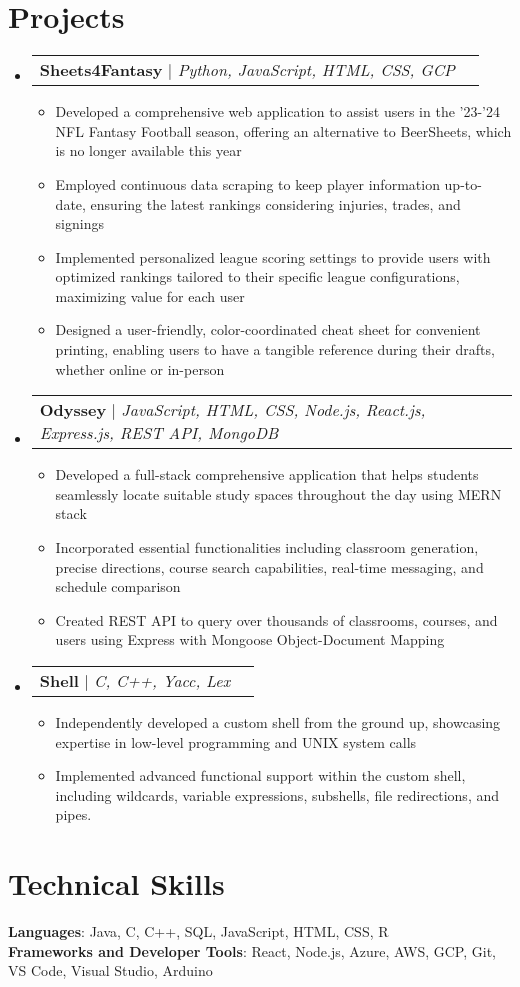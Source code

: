 \documentclass[letterpaper,11pt]{article}
\makeatletter
\newcommand{\resumeItem}[1]{
  \item\small{
    {#1 \vspace{-2pt}}
  }
}
\newcommand{\resumeProjectHeading}[2]{
    \item
    \begin{tabular*}{0.97\textwidth}{l@{\extracolsep{\fill}}r}
      \small#1 & #2 \\
    \end{tabular*}\vspace{-7pt}
}
\newcommand{\resumeSubHeadingListStart}{\begin{itemize}[leftmargin=0.15in, label={}]}
\newcommand{\resumeSubHeadingListEnd}{\end{itemize}}
\newcommand{\resumeItemListStart}{\begin{itemize}}
\newcommand{\resumeItemListEnd}{\end{itemize}\vspace{-5pt}}
\makeatother
\begin{document}
\section{Projects}
    \resumeSubHeadingListStart
      \resumeProjectHeading
          {\textbf{Sheets4Fantasy} $|$ \emph{Python, JavaScript, HTML, CSS, GCP}}{}
          \resumeItemListStart
            \resumeItem{Developed a comprehensive web application to assist users in the '23-'24 NFL Fantasy Football season, offering an alternative to BeerSheets, which is no longer available this year}
            \resumeItem{Employed continuous data scraping to keep player information up-to-date, ensuring the latest rankings considering injuries, trades, and signings}
            \resumeItem{Implemented personalized league scoring settings to provide users with optimized rankings tailored to their specific league configurations, maximizing value for each user}
            \resumeItem{Designed a user-friendly, color-coordinated cheat sheet for convenient printing, enabling users to have a tangible reference during their drafts, whether online or in-person}
          \resumeItemListEnd
      \resumeProjectHeading
          {\textbf{Odyssey} $|$ \emph{JavaScript, HTML, CSS, Node.js, React.js, Express.js, REST API, MongoDB}}{}
          \resumeItemListStart
            \resumeItem{Developed a full-stack comprehensive application that helps students seamlessly locate suitable study spaces throughout the day using MERN stack}
            \resumeItem{Incorporated essential functionalities including classroom generation, precise directions, course search capabilities, real-time messaging, and schedule comparison}
            \resumeItem{Created REST API to query over thousands of classrooms, courses, and users using Express with Mongoose Object-Document Mapping}
          \resumeItemListEnd
      \resumeProjectHeading
          {\textbf{Shell} $|$ \emph{C, C++, Yacc, Lex}}{}
          \resumeItemListStart
            \resumeItem{Independently developed a custom shell from the ground up, showcasing expertise in low-level programming and UNIX system calls}
            \resumeItem{Implemented advanced functional support within the custom shell, including wildcards, variable expressions, subshells, file redirections, and pipes.}
          \resumeItemListEnd
    \resumeSubHeadingListEnd

%
\section{Technical Skills}
 \begin{itemize}[leftmargin=0.15in, label={}]
    \small{\item{
     \textbf{Languages}{: Java, C, C++, SQL, JavaScript, HTML, CSS, R} \\
     \textbf{Frameworks and Developer Tools}{: React, Node.js, Azure, AWS, GCP, Git, VS Code, Visual Studio, Arduino} \\
    }}
 \end{itemize}


\end{document}
